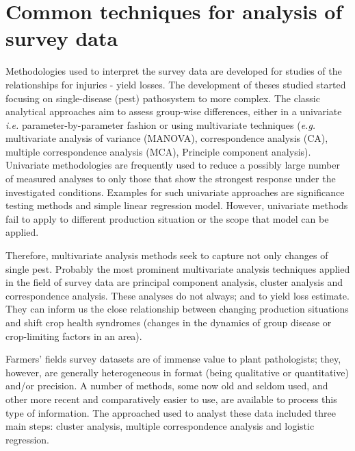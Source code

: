 \documentclass[12pt, oneside]{report}
\begin{document}
\section*{Common techniques for analysis of survey data}

Methodologies used to interpret the survey data are developed for studies of the relationships for injuries - yield losses. The development of theses studied started focusing on single-disease (pest) pathosystem to more complex. The classic analytical approaches aim to assess group-wise differences, either in a univariate \textit{i.e.} parameter-by-parameter fashion or using multivariate techniques (\textit{e.g.} multivariate analysis of variance (MANOVA), correspondence analysis (CA), multiple correspondence analysis (MCA), Principle component analysis). Univariate methodologies are frequently used to reduce a possibly large number of measured analyses to only those that show the strongest response under the investigated conditions. Examples for such univariate approaches are significance testing methods and simple linear regression model. However, univariate methods fail to apply to different production situation or the scope that model can be applied.


Therefore, multivariate analysis methods seek to capture not only changes of single pest. Probably the most prominent multivariate analysis techniques applied in the field of survey data are principal component analysis, cluster analysis and correspondence analysis. These analyses do not always; and to yield loss estimate. They can inform us the close relationship between changing production situations and shift crop health syndromes (changes in the dynamics of group disease or crop-limiting factors in an area). 

Farmers' fields survey datasets are of immense value to plant pathologists; they, however, are generally heterogeneous in format (being qualitative or quantitative) and/or precision. A number of methods, some now old and seldom used, and other more recent and comparatively easier to use, are available to process this type of information. The approached used to analyst these data included three main steps: cluster analysis, multiple correspondence analysis and logistic regression.
\end{document}
